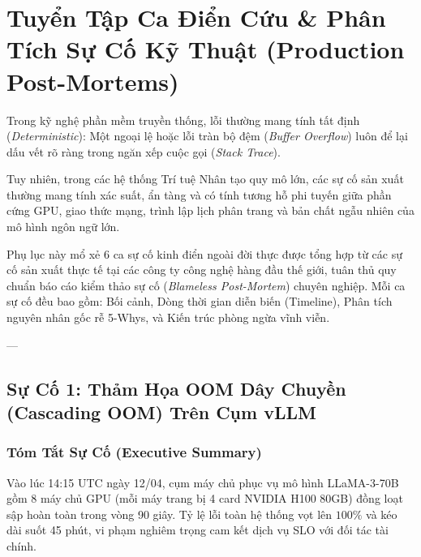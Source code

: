 
\chapter{Tuyển Tập Ca Điển Cứu \& Phân Tích Sự Cố Kỹ Thuật (Production Post-Mortems)}
\label{ch:appendix-postmortems}

Trong kỹ nghệ phần mềm truyền thống, lỗi thường mang tính tất định (\textit{Deterministic}): Một ngoại lệ  hoặc lỗi tràn bộ đệm (\textit{Buffer Overflow}) luôn để lại dấu vết rõ ràng trong ngăn xếp cuộc gọi (\textit{Stack Trace}). 

Tuy nhiên, trong các hệ thống Trí tuệ Nhân tạo quy mô lớn, các sự cố sản xuất thường mang tính xác suất, ẩn tàng và có tính tương hỗ phi tuyến giữa phần cứng GPU, giao thức mạng, trình lập lịch phân trang và bản chất ngẫu nhiên của mô hình ngôn ngữ lớn.

Phụ lục này mổ xẻ 6 ca sự cố kinh điển ngoài đời thực được tổng hợp từ các sự cố sản xuất thực tế tại các công ty công nghệ hàng đầu thế giới, tuân thủ quy chuẩn báo cáo kiểm thảo sự cố (\textit{Blameless Post-Mortem}) chuyên nghiệp. Mỗi ca sự cố đều bao gồm: Bối cảnh, Dòng thời gian diễn biến (Timeline), Phân tích nguyên nhân gốc rễ 5-Whys, và Kiến trúc phòng ngừa vĩnh viễn.

---

\section{Sự Cố 1: Thảm Họa OOM Dây Chuyền (Cascading OOM) Trên Cụm vLLM}
\label{sec:postmortem-cascading-oom}

\subsection{Tóm Tắt Sự Cố (Executive Summary)}
Vào lúc 14:15 UTC ngày 12/04, cụm máy chủ phục vụ mô hình LLaMA-3-70B gồm 8 máy chủ GPU (mỗi máy trang bị 4 card NVIDIA H100 80GB) đồng loạt sập hoàn toàn trong vòng 90 giây. Tỷ lệ lỗi toàn hệ thống vọt lên $100\%$ và kéo dài suốt 45 phút, vi phạm nghiêm trọng cam kết dịch vụ SLO với đối tác tài chính.


